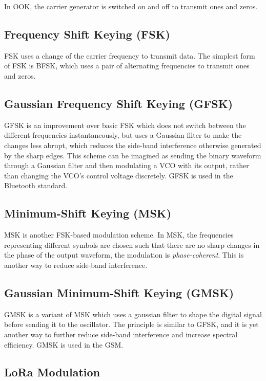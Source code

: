 In \gls{OOK}, the carrier generator is switched on and off to transmit ones and zeros. 

\subsection{Frequency Shift Keying (FSK)}

\Gls{FSK} uses a change of the carrier frequency to transmit data. The simplest form of \gls{FSK} is \gls{BFSK}, which uses a pair of alternating frequencies to transmit ones and zeros.

\subsection{Gaussian Frequency Shift Keying (GFSK)}

\Gls{GFSK} is an improvement over basic \gls{FSK} which does not switch between the different frequencies instantaneously, but uses a Gaussian filter to make the changes less abrupt, which reduces the side-band interference otherwise generated by the sharp edges. This scheme can be imagined as sending the binary waveform through a Gaussian filter and then modulating a \gls{VCO} with its output, rather than changing the \gls{VCO}'s control voltage discretely. \Gls{GFSK} is used in the Bluetooth standard.

\subsection{Minimum-Shift Keying (MSK)}

\Gls{MSK} is another \gls{FSK}-based modulation scheme. In \gls{MSK}, the frequencies representing different symbols are chosen such that there are no sharp changes in the phase of the output waveform, the modulation is \textit{phase-coherent}. This is another way to reduce side-band interference.

\subsection{Gaussian Minimum-Shift Keying (GMSK)}

\Gls{GMSK} is a variant of \gls{MSK} which uses a gaussian filter to shape the digital signal before sending it to the oscillator. The principle is similar to \gls{GFSK}, and it is yet another way to further reduce side-band interference and increase spectral efficiency. GMSK is used in the \gls{GSM}.

\subsection{LoRa Modulation}

